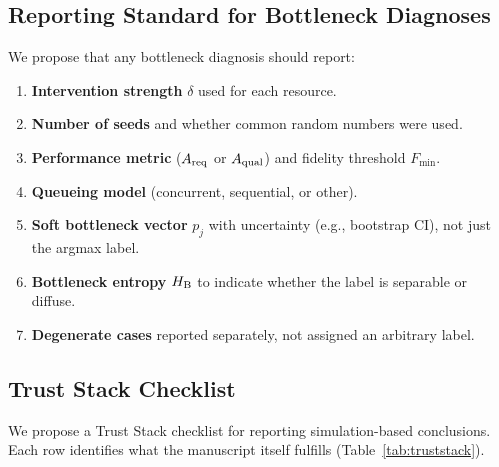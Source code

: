 \documentclass[aps,prapplied,reprint,superscriptaddress]{revtex4-2}
\newcommand{\Areq}{A_{\rm req}}
\newcommand{\Aqual}{A_{\rm qual}}
\newcommand{\HB}{H_{\rm B}}
\begin{document}
\subsection{Reporting Standard for Bottleneck Diagnoses}

We propose that any bottleneck diagnosis should report:
\begin{enumerate}[leftmargin=2em]
\item \textbf{Intervention strength} $\delta$ used for each resource.
\item \textbf{Number of seeds} and whether common random numbers were used.
\item \textbf{Performance metric} ($\Areq$ or $\Aqual$) and fidelity threshold $F_{\min}$.
\item \textbf{Queueing model} (concurrent, sequential, or other).
\item \textbf{Soft bottleneck vector} $p_j$ with uncertainty (e.g., bootstrap CI), not just the argmax label.
\item \textbf{Bottleneck entropy} $\HB$ to indicate whether the label is separable or diffuse.
\item \textbf{Degenerate cases} reported separately, not assigned an arbitrary label.
\end{enumerate}

\subsection{Trust Stack Checklist}

We propose a Trust Stack checklist for reporting simulation-based conclusions. Each row identifies what the manuscript itself fulfills (Table~\ref{tab:truststack}).
\end{document}

